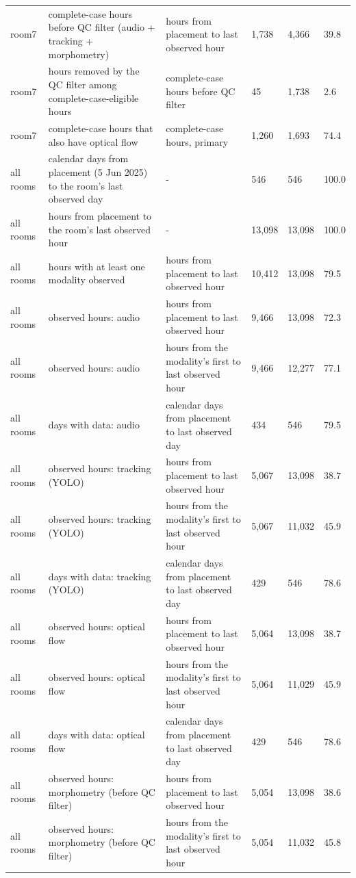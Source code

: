\begin{tabular}{llllll}
room7 & complete-case hours before QC filter (audio + tracking + morphometry) & hours from placement to last observed hour & 1,738 & 4,366 & 39.8 \\
room7 & hours removed by the QC filter among complete-case-eligible hours & complete-case hours before QC filter & 45 & 1,738 & 2.6 \\
room7 & complete-case hours that also have optical flow & complete-case hours, primary & 1,260 & 1,693 & 74.4 \\
all rooms & calendar days from placement (5 Jun 2025) to the room's last observed day & - & 546 & 546 & 100.0 \\
all rooms & hours from placement to the room's last observed hour & - & 13,098 & 13,098 & 100.0 \\
all rooms & hours with at least one modality observed & hours from placement to last observed hour & 10,412 & 13,098 & 79.5 \\
all rooms & observed hours: audio & hours from placement to last observed hour & 9,466 & 13,098 & 72.3 \\
all rooms & observed hours: audio & hours from the modality's first to last observed hour & 9,466 & 12,277 & 77.1 \\
all rooms & days with data: audio & calendar days from placement to last observed day & 434 & 546 & 79.5 \\
all rooms & observed hours: tracking (YOLO) & hours from placement to last observed hour & 5,067 & 13,098 & 38.7 \\
all rooms & observed hours: tracking (YOLO) & hours from the modality's first to last observed hour & 5,067 & 11,032 & 45.9 \\
all rooms & days with data: tracking (YOLO) & calendar days from placement to last observed day & 429 & 546 & 78.6 \\
all rooms & observed hours: optical flow & hours from placement to last observed hour & 5,064 & 13,098 & 38.7 \\
all rooms & observed hours: optical flow & hours from the modality's first to last observed hour & 5,064 & 11,029 & 45.9 \\
all rooms & days with data: optical flow & calendar days from placement to last observed day & 429 & 546 & 78.6 \\
all rooms & observed hours: morphometry (before QC filter) & hours from placement to last observed hour & 5,054 & 13,098 & 38.6 \\
all rooms & observed hours: morphometry (before QC filter) & hours from the modality's first to last observed hour & 5,054 & 11,032 & 45.8 \\

\end{tabular}
